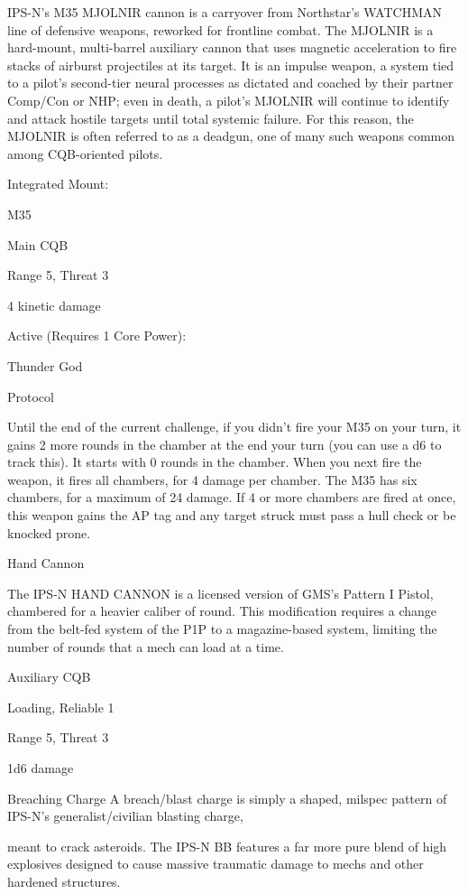   IPS-N’s M35 MJOLNIR cannon is a carryover from Northstar’s WATCHMAN line of defensive weapons,
  reworked for frontline combat. The MJOLNIR is a hard-mount, multi-barrel auxiliary cannon that uses
  magnetic acceleration to fire stacks of airburst projectiles at its target. It is an impulse weapon, a system
  tied to a pilot’s second-tier neural processes as dictated and coached by their partner Comp/Con or
  NHP; even in death, a pilot’s MJOLNIR will continue to identify and attack hostile targets until total
  systemic failure. For this reason, the MJOLNIR is often referred to as a deadgun, one of many such
  weapons common among CQB-oriented pilots.

  Integrated Mount:

  M35

  Main CQB

  Range 5, Threat 3

  4 kinetic damage


  Active (Requires 1 Core Power):

  Thunder God

  Protocol

  Until the end of the current challenge, if you didn’t fire your M35 on your turn, it gains 2 more rounds in
  the chamber at the end your turn (you can use a d6 to track this). It starts with 0 rounds in the chamber.
  When you next fire the weapon, it fires all chambers, for 4 damage per chamber. The M35 has six
  chambers, for a maximum of 24 damage. If 4 or more chambers are fired at once, this weapon gains
  the AP tag and any target struck must pass a hull check or be knocked prone.

Hand Cannon




The IPS-N HAND CANNON is a licensed version of GMS’s Pattern I Pistol, chambered for a heavier caliber
of round. This modification requires a change from the belt-fed system of the P1P to a magazine-based
system, limiting the number of rounds that a mech can load at a time.

Auxiliary CQB

Loading, Reliable 1

Range 5, Threat 3

1d6 damage


Breaching Charge
A breach/blast charge is simply a shaped, milspec pattern of IPS-N’s generalist/civilian blasting charge,

meant to crack asteroids. The IPS-N BB features a far more pure blend of high explosives designed to
cause massive traumatic damage to mechs and other hardened structures.

